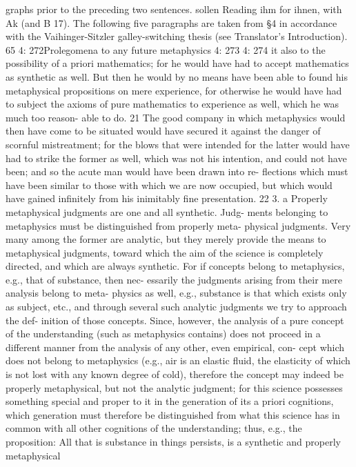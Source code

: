 graphs prior to the preceding two sentences.
sollen
Reading ihm for ihnen, with Ak (and B 17).
The following ﬁve paragraphs are taken from §4 in accordance with the Vaihinger-Sitzler
galley-switching thesis (see Translator’s Introduction).
65
4: 272Prolegomena to any future metaphysics
4: 273
4: 274
it also to the possibility of a priori mathematics; for he would have had
to accept mathematics as synthetic as well. But then he would by no
means have been able to found his metaphysical propositions on mere
experience, for otherwise he would have had to subject the axioms of
pure mathematics to experience as well, which he was much too reason-
able to do. 21 The good company in which metaphysics would then have
come to be situated would have secured it against the danger of scornful
mistreatment; for the blows that were intended for the latter would have
had to strike the former as well, which was not his intention, and could
not have been; and so the acute man would have been drawn into re-
ﬂections which must have been similar to those with which we are now
occupied, but which would have gained inﬁnitely from his inimitably
ﬁne presentation. 22
3. a Properly metaphysical judgments are one and all synthetic. Judg-
ments belonging to metaphysics must be distinguished from properly meta-
physical judgments. Very many among the former are analytic, but they
merely provide the means to metaphysical judgments, toward which the
aim of the science is completely directed, and which are always synthetic.
For if concepts belong to metaphysics, e.g., that of substance, then nec-
essarily the judgments arising from their mere analysis belong to meta-
physics as well, e.g., substance is that which exists only as subject, etc.,
and through several such analytic judgments we try to approach the def-
inition of those concepts. Since, however, the analysis of a pure concept
of the understanding (such as metaphysics contains) does not proceed in
a different manner from the analysis of any other, even empirical, con-
cept which does not belong to metaphysics (e.g., air is an elastic ﬂuid, the
elasticity of which is not lost with any known degree of cold), therefore
the concept may indeed be properly metaphysical, but not the analytic
judgment; for this science possesses something special and proper to it in
the generation of its a priori cognitions, which generation must therefore
be distinguished from what this science has in common with all other
cognitions of the understanding; thus, e.g., the proposition: All that is
substance in things persists, is a synthetic and properly metaphysical
